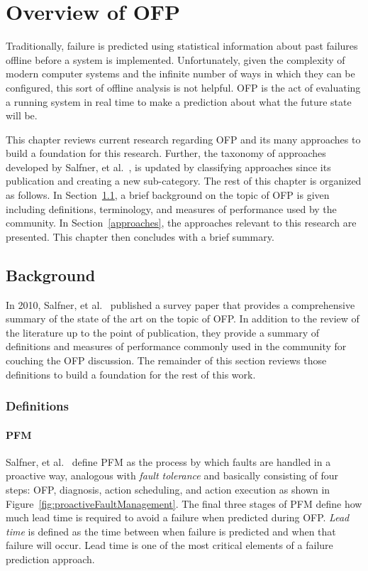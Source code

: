 \section{Overview of \ac{OFP}} \label{chapter2}
Traditionally, failure is predicted using statistical information about past
failures offline before a system is implemented.  Unfortunately, given the
complexity of modern computer systems and the infinite number of ways in which
they can be configured, this sort of offline analysis is not helpful.  \ac{OFP}
is the act of evaluating a running system in real time to make a prediction
about what the future state will be.

This chapter reviews current research regarding \ac{OFP} and its many
approaches to build a foundation for this research.  Further, the taxonomy of
approaches developed by Salfner, et al.~\cite{salfnerSurvey}, is updated by
classifying approaches since its publication and creating a new sub-category.
The rest of this chapter is organized as follows.  In Section~\ref{background},
a brief background on the topic of \ac{OFP} is given including definitions,
terminology, and measures of performance used by the community.  In
Section~\ref{approaches}, the approaches relevant to this research are
presented.  This chapter then concludes with a brief summary.

\subsection{Background} \label{background}
In 2010, Salfner, et al.~\cite{salfnerSurvey} published a survey paper that
provides a comprehensive summary of the state of the art on the topic of
\ac{OFP}.  In addition to the review of the literature up to the point of
publication, they provide a summary of definitions and measures of performance
commonly used in the community for couching the \ac{OFP} discussion.  The
remainder of this section reviews those definitions to build a foundation for
the rest of this work.

\subsubsection{Definitions} \label{definitions}
\paragraph{\ac{PFM}} \label{pfm}
Salfner, et al.~\cite{salfnerSurvey} define \ac{PFM} as the process by which
faults are handled in a proactive way, analogous with \emph{fault tolerance}
and basically consisting of four steps: \ac{OFP}, diagnosis, action scheduling,
and action execution as shown in Figure~\ref{fig:proactiveFaultManagement}.
The final three stages of \ac{PFM} define how much lead time is required to
avoid a failure when predicted during \ac{OFP}.  \emph{Lead time} is defined as
the time between when failure is predicted and when that failure will occur.
Lead time is one of the most critical elements of a failure prediction
approach.

